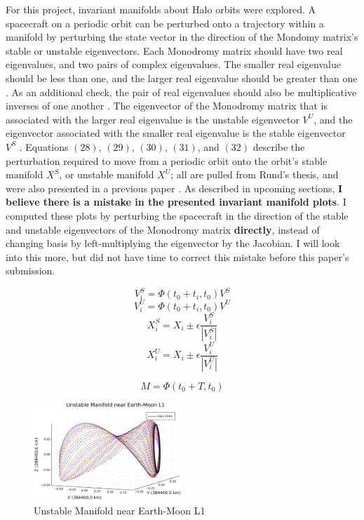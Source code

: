 \documentclass[conf]{new-aiaa}
\begin{document}
\begin{multicols}{2}
For this project, invariant manifolds about Halo orbits were 
explored. A spacecraft on a periodic orbit can be perturbed 
onto a trajectory within a manifold by perturbing the 
state vector in the direction of the Mondomy matrix's stable 
or unstable eigenvectors. Each Monodromy matrix should have 
two real eigenvalues, and two pairs of complex eigenvalues.
The smaller real eigenvalue should be less than one,
and the larger real eigenvalue should be greater than one 
\cite{gomez2001dynamicsv1}. As an additional check, 
the pair of real eigenvalues should also be multiplicative 
inverses of one another \cite{mirelesNotes}. The eigenvector 
of the Monodromy matrix that is associated with the 
larger real eigenvalue is the unstable eigenvector $V^U$, and 
the eigenvector associated with the smaller real eigenvalue is 
the stable eigenvector $V^S$ \cite{rund2018interplanetary}.
Equations $(28)$, $(29)$, $(30)$, $(31)$, and $(32)$ describe 
the perturbation required to move from a periodic orbit 
onto the orbit's stable manifold $X^S$, or unstable manifold $X^U$;
all are pulled from Rund's thesis, and were also presented 
in a previous paper \cite{rund2018interplanetary} \cite{carpinelli2020halos}.
As described in upcoming sections, \textbf{I believe there is a mistake 
in the presented invariant manifold plots}. I computed these plots by 
perturbing the spacecraft in the direction of the stable and 
unstable eigenvectors of the Monodromy matrix \textbf{directly}, instead of 
changing basis by left-multiplying the eigenvector by the Jacobian. I will 
look into this more, but did not have time to correct this mistake before 
this paper's submission.

\begin{equation}
    V_i^{S} = \Phi(t_0 + t_i, t_0) V^S
\end{equation}
\begin{equation}
    V_i^{U} = \Phi(t_0 + t_i, t_0) V^U
\end{equation}
\begin{equation}
    X_i^{S} = X_i \pm \epsilon \frac{V_i^S}{|V_i^S|}
\end{equation}
\begin{equation}
    X_i^{U} = X_i \pm \epsilon \frac{V_i^U}{|V_i^U|}
\end{equation}

\begin{equation}
M = \Phi(t_0 + T, t_0)
\end{equation}

\begin{figure}[H]
    \hskip -0.3cm
    \includegraphics[width=0.5\textwidth]{unstable_manifold.png}
    \caption{Unstable Manifold near Earth-Moon L1}
\end{figure}


\end{multicols}
\end{document}
